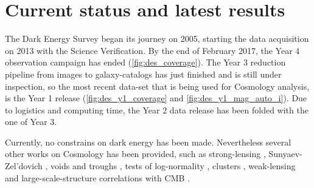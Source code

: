 \section{Current status and latest results}
The Dark Energy Survey began its journey on 2005, starting the data acquisition on 2013 with the Science Verification. By the end of February 2017, the Year 4 observation campaign has ended (\autoref{fig:des_coverage}). The Year 3 reduction pipeline from images to galaxy-catalogs has just finished and is still under inspection, so the most recent data-set that is being used for Cosmology analysis, is the Year 1 release (\autoref{fig:des_y1_coverage} and \autoref{fig:des_y1_mag_auto_i}). Due to logistics and computing time, the Year 2 data release has been folded with the one of Year 3.
\newline

Currently, no constrains on dark energy has been made. Nevertheless several other works on Cosmology has been provided, such as strong-lensing \cite{2015MNRAS.454.1260A,2016ApJ...827...51N,2017ApJ...838L..15L}, Sunyaev-Zel'dovich \cite{2016arXiv160508770S}, voids and troughs \cite{2016MNRAS.455.3367G,2017MNRAS.465..746S}, tests of log-normality \cite{2017MNRAS.466.1444C}, clusters \cite{2017MNRAS.467.4015H}, weak-lensing \cite{2015PhRvD..92b2006V,2016PhRvD..94b2002B,2016MNRAS.459...21K,2016MNRAS.461.3172S,2016MNRAS.461.4099B,2016arXiv160908167P,2017MNRAS.465.4204C} and large-scale-structure correlations with CMB \cite{2016MNRAS.456.3213G,2016MNRAS.459...21K,2017MNRAS.465.4166K}.
\newline

